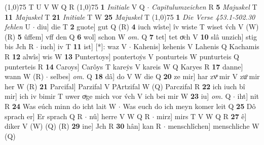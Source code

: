 \documentclass[8pt,a4paper,notitlepage]{article}
\begin{document}
\begin{table}[ht]
\begin{minipage}[t]{0.5\linewidth}
\begin{tabular}{rl}
\end{tabular}
\scriptsize
\line(1,0){75} \newline
T U V W Q R \newline
\line(1,0){75} \newline
\textbf{1} \textit{Initiale} V Q   $\cdot$ \textit{Capitulumzeichen} R  \textbf{5} \textit{Majuskel} T  \textbf{11} \textit{Majuskel} T  \textbf{21} \textit{Initiale} T W  \textbf{25} \textit{Majuskel} T  \newline
\line(1,0){75} \newline
\textbf{1} \textit{Die Verse 453.1-502.30 fehlen} U   $\cdot$ diu] die T \textbf{2} guote] gut Q (R) \textbf{4} iuch wîste] îv wiste T wiset v́ch V (W) (R) \textbf{5} ûffem] vff den Q \textbf{6} wol] schon W \textit{om.} Q \textbf{7} tet] tet oͮch V \textbf{10} slâ unzich] stig bis Jch R  $\cdot$ iuch] iv T \textbf{11} ist] [*]: waz V  $\cdot$ Kahenis] kehenis V Lahenis Q Kachamis R \textbf{12} alwîs] wis W \textbf{13} Puntertoys] pontertoẏs V ponturteis W punturteis Q punterteis R \textbf{14} Caroys] Carôys T kareẏs V kareis W Q Karyes R \textbf{17} danne] wann W (R)  $\cdot$ selbes] \textit{om.} Q \textbf{18} dâ] do V W die Q \textbf{20} ze mir] har zvͦ mir V zuͦ mir her W (R) \textbf{21} Parcifal] Parzifal V PArtzifal W (Q) Parczifal R \textbf{22} ich iuch bî mir] ich iv bimir T uwer oͮge mich vor v́ch V ich bei mir W \textbf{23} iu] \textit{om.} Q  $\cdot$ iht] nit R \textbf{24} Was eúch minn do icht lait W  $\cdot$ Was euch do ich meyn komer leit Q \textbf{25} Dô sprach er] Er sprach Q R  $\cdot$ nû] herre V W Q R  $\cdot$ mirz] mirs T V W Q R \textbf{27} ê] diker V (W) (Q) (R) \textbf{29} ine] Jch R \textbf{30} hân] kan R  $\cdot$ menschlîchen] menschliche W (Q) \newline
\end{minipage}
\end{table}
\end{document}
